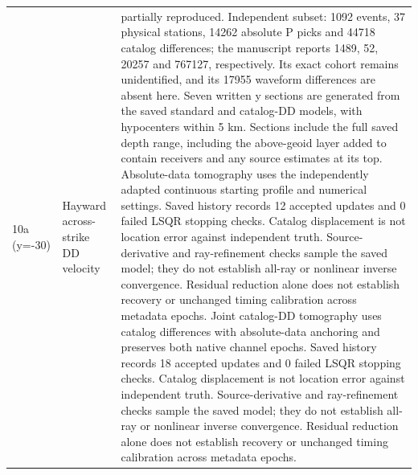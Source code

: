 \begin{longtable}{>{\raggedright\arraybackslash}p{}>{\raggedright\arraybackslash}p{}>{\raggedright\arraybackslash}p{}}
10a (y=-30) & Hayward across-strike DD velocity & partially reproduced. Independent subset: 1092 events, 37 physical stations, 14262 absolute P picks and 44718 catalog differences; the manuscript reports 1489, 52, 20257 and 767127, respectively. Its exact cohort remains unidentified, and its 17955 waveform differences are absent here. Seven written y sections are generated from the saved standard and catalog-DD models, with hypocenters within 5 km. Sections include the full saved depth range, including the above-geoid layer added to contain receivers and any source estimates at its top. Absolute-data tomography uses the independently adapted continuous starting profile and numerical settings. Saved history records 12 accepted updates and 0 failed LSQR stopping checks. Catalog displacement is not location error against independent truth. Source-derivative and ray-refinement checks sample the saved model; they do not establish all-ray or nonlinear inverse convergence. Residual reduction alone does not establish recovery or unchanged timing calibration across metadata epochs. Joint catalog-DD tomography uses catalog differences with absolute-data anchoring and preserves both native channel epochs. Saved history records 18 accepted updates and 0 failed LSQR stopping checks. Catalog displacement is not location error against independent truth. Source-derivative and ray-refinement checks sample the saved model; they do not establish all-ray or nonlinear inverse convergence. Residual reduction alone does not establish recovery or unchanged timing calibration across metadata epochs.\\

\end{longtable}
